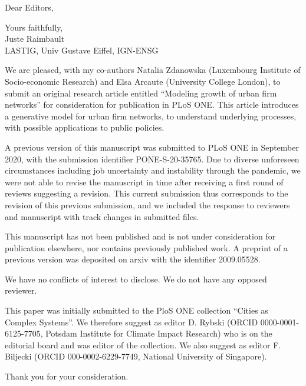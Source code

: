 \documentclass[11pt,a4paper,sans]{moderncv}
\begin{document}
\date{May 12th 2022}
\opening{Dear Editors,}
\closing{Yours faithfully,\\
Juste Raimbault\\
LASTIG, Univ Gustave Eiffel, IGN-ENSG
}
   
\makelettertitle

\justify
We are pleased, with my co-authors Natalia Zdanowska (Luxembourg Institute of Socio-economic Research) and Elsa Arcaute (University College London), to submit an original research article entitled ``Modeling growth of urban firm networks'' for consideration for publication in PLoS ONE. This article introduces a generative model for urban firm networks, to understand underlying processes, with possible applications to public policies.

A previous version of this manuscript was submitted to PLoS ONE in September 2020, with the submission identifier PONE-S-20-35765. Due to diverse unforeseen circumstances including job uncertainty and instability through the pandemic, we were not able to revise the manuscript in time after receiving a first round of reviews suggesting a revision. This current submission thus corresponds to the revision of this previous submission, and we included the response to reviewers and manuscript with track changes in submitted files.

This manuscript has not been published and is not under consideration for publication elsewhere, nor contains previously published work. A preprint of a previous version was deposited on arxiv with the identifier 2009.05528.

We have no conflicts of interest to disclose. We do not have any opposed reviewer.

This paper was initially submitted to the PloS ONE collection ``Cities as Complex Systems''. We therefore suggest as editor D. Rybski (ORCID 0000-0001-6125-7705, Potsdam Institute for Climate Impact Research) who is on the editorial board and was editor of the collection. We also suggest as editor F. Biljecki (ORCID 000-0002-6229-7749, National University of Singapore).


Thank you for your consideration.
\justify




\makeletterclosing
\end{document}
